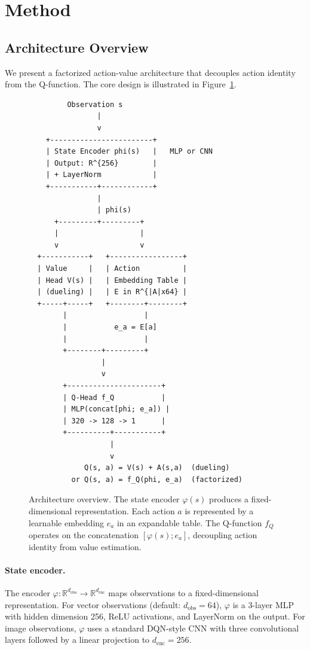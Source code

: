 \documentclass{article}
\begin{document}
\section{Method}
\label{sec:method}

\subsection{Architecture Overview}

We present a factorized action-value architecture that decouples action identity from the Q-function. The core design is illustrated in Figure~\ref{fig:arch}.

\begin{figure}[h]
  \centering
  \begin{minipage}{0.85\linewidth}
  {\small
  \begin{verbatim}
         Observation s
                |
                v
    +------------------------+
    | State Encoder phi(s)   |   MLP or CNN
    | Output: R^{256}        |
    | + LayerNorm            |
    +-----------+------------+
                |
                | phi(s)
      +---------+---------+
      |                   |
      v                   v
  +-----------+   +-----------------+
  | Value     |   | Action          |
  | Head V(s) |   | Embedding Table |
  | (dueling) |   | E in R^{|A|x64} |
  +-----+-----+   +--------+--------+
        |                  |
        |           e_a = E[a]
        |                  |
        +--------+---------+
                 |
                 v
        +----------------------+
        | Q-Head f_Q           |
        | MLP(concat[phi; e_a]) |
        | 320 -> 128 -> 1      |
        +----------+-----------+
                   |
                   v
             Q(s, a) = V(s) + A(s,a)  (dueling)
          or Q(s, a) = f_Q(phi, e_a)  (factorized)
  \end{verbatim}
  }
  \end{minipage}
  \caption{Architecture overview. The state encoder $\varphi(s)$ produces a fixed-dimensional representation. Each action $a$ is represented by a learnable embedding $e_a$ in an expandable table. The Q-function $f_Q$ operates on the concatenation $[\varphi(s); e_a]$, decoupling action identity from value estimation.}
  \label{fig:arch}
\end{figure}

\paragraph{State encoder.} The encoder $\varphi: \mathbb{R}^{d_\text{obs}} \to \mathbb{R}^{d_\text{enc}}$ maps observations to a fixed-dimensional representation. For vector observations (default: $d_\text{obs}=64$), $\varphi$ is a 3-layer MLP with hidden dimension 256, ReLU activations, and LayerNorm on the output. For image observations, $\varphi$ uses a standard DQN-style CNN with three convolutional layers followed by a linear projection to $d_\text{enc}=256$.
\end{document}
